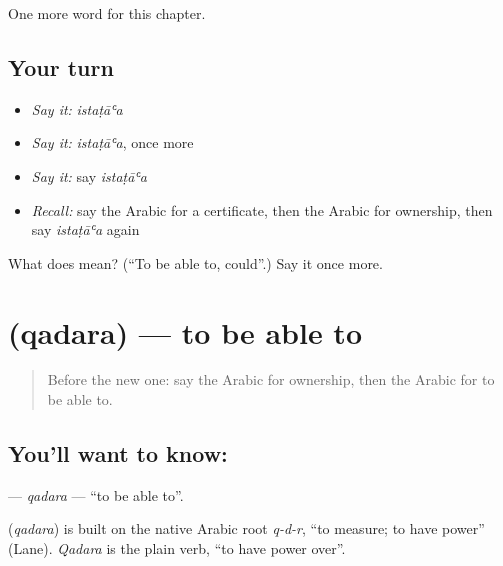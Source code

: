 \begin{grammarlens}[title={What you've built}]
One more word for this chapter.
\end{grammarlens}

\subsection*{Your turn}
\begin{itemize}
\raggedright
  \item \emph{Say it:} \emph{istaṭāʿa}
  \item \emph{Say it:} \emph{istaṭāʿa}, once more
  \item \emph{Say it:} say \emph{istaṭāʿa}
  \item \emph{Recall:} say the Arabic for a certificate, then the Arabic for ownership, then say \emph{istaṭāʿa} again
\end{itemize}

\begin{tcolorbox}[breakable,colback=teal!4,colframe=teal!35!black,title={Before you move on}]
What does  mean? (\textquotedblleft{}To be able to, could\textquotedblright{}.) Say it once more.
\end{tcolorbox}
\section[\texorpdfstring{\ar{قدر} (qadara)}{قدر (qadara)}]{ (qadara) — to be able to}

\label{lesson:AR-C107-qadara}



\begin{quote}
Before the new one: say the Arabic for ownership, then the Arabic for to be able to.
\end{quote}

\subsection*{You'll want to know: }
\textbf{} — \emph{qadara} — \textquotedblleft{}to be able to\textquotedblright{}.

\begin{cousinweb}
\textbf{} (\emph{qadara}) is built on the native Arabic root \emph{q-d-r}, \textquotedblleft{}to measure; to have power\textquotedblright{} (Lane). \emph{Qadara} is the plain verb, \textquotedblleft{}to have power over\textquotedblright{}.
\end{cousinweb}

